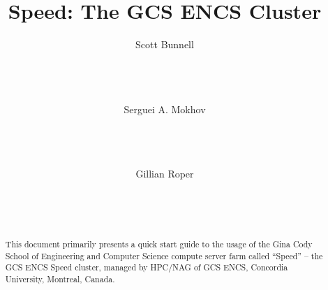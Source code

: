 \documentclass{easychair}
\begin{document}
%
\title{Speed: The GCS ENCS Cluster}

%

%
\author{
    Scott Bunnell\\
    \\
    \\
    \\
\and
    Serguei A. Mokhov\\
    \\
    \\
    \\
\and
    Gillian Roper\\
    \\
    \\
    \\
}

%

\maketitle

\begin{abstract}
This document primarily presents a quick start
guide to the usage of the Gina Cody School of
Engineering and Computer Science compute server farm
called ``Speed'' -- the GCS ENCS Speed cluster,
managed by HPC/NAG of GCS ENCS, Concordia University,
Montreal, Canada.
\end{abstract}
\end{document}
